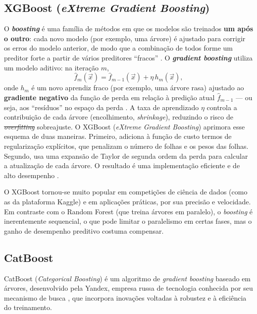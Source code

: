 \documentclass[msc]{on} %
\makeatletter
\providecommand{\DIFaddtex}[1]{{\protect\color{red}#1}} %
\providecommand{\DIFdeltex}[1]{{\protect\color{red}\sout{#1}}} %
\providecommand{\DIFaddbegin}{} %
\providecommand{\DIFaddend}{} %
\providecommand{\DIFdelbegin}{} %
\providecommand{\DIFdelend}{} %
\providecommand{\DIFadd}[1]{\texorpdfstring{\DIFaddtex{#1}}{#1}} %
\providecommand{\DIFdel}[1]{\texorpdfstring{\DIFdeltex{#1}}{}} %
\let\sout@orig\sout %
\renewcommand{\sout}[1]{\ifmmode\text{\sout@orig{\ensuremath{#1}}}\else\sout@orig{#1}\fi} %
\makeatother
\begin{document}
\subsection{XGBoost (\texorpdfstring{\textit{eXtreme Gradient Boosting}}{eXtreme Gradient Boosting})}

O \textbf{\textit{boosting}} é uma família de métodos em que os modelos são treinados \textbf{um após o outro}: cada novo modelo (por exemplo, uma árvore) é ajustado para corrigir os erros do modelo anterior, de modo que a combinação de todos forme um preditor forte a partir de vários preditores ``fracos'' \citep{geron2019maos, Levada2026}. O \textbf{\textit{gradient boosting}} utiliza um modelo aditivo: na iteração \(m\),
\begin{equation}
\hat{f}_m(\vec{x}) = \hat{f}_{m-1}(\vec{x}) + \eta \, h_m(\vec{x}),
\end{equation}
onde \(h_m\) é um novo aprendiz fraco (por exemplo, uma árvore rasa) ajustado ao \textbf{gradiente negativo} da função de perda em relação à predição atual \(\hat{f}_{m-1}\) --- ou seja, aos ``resíduos'' no espaço da perda \citep{geron2019maos}. A taxa de aprendizado \(\eta\) controla a contribuição de cada árvore (encolhimento, \textit{shrinkage}), reduzindo o risco de \DIFdelbegin \textit{\DIFdel{overfitting}}%
\DIFdelend\ifhmode\hskip0pt\fi \DIFaddbegin \DIFadd{sobreajuste}\DIFaddend . O XGBoost (\textit{eXtreme Gradient Boosting}) \citep{Chen2016} aprimora esse esquema de duas maneiras. Primeiro, adiciona à função de custo termos de regularização explícitos, que penalizam o número de folhas e os pesos das folhas. Segundo, usa uma expansão de Taylor de segunda ordem da perda para calcular a atualização de cada árvore. O resultado é uma implementação eficiente e de alto desempenho \citep{geron2019maos}.

O XGBoost tornou-se muito popular em competições de ciência de dados (como as da plataforma Kaggle) e em aplicações práticas, por sua precisão e velocidade. Em contraste com o Random Forest (que treina árvores em paralelo), o \textit{boosting} é inerentemente sequencial, o que pode limitar o paralelismo em certas fases, mas o ganho de desempenho preditivo costuma compensar.

\subsection{CatBoost}

CatBoost (\textit{Categorical Boosting}) é um algoritmo de \textit{gradient boosting} baseado em árvores, desenvolvido pela Yandex, empresa russa de tecnologia conhecida por seu mecanismo de busca \citep{Prokhorenkova2018}, que incorpora inovações voltadas à robustez e à eficiência do treinamento.
\end{document}
